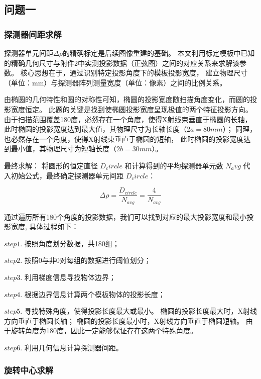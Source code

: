 \subsection{问题一}
\subsubsection{探测器间距求解}

探测器单元间距$\Delta\rho$的精确标定是后续图像重建的基础。
本文利用标定模板中已知的精确几何尺寸与附件2中实测投影数据（正弦图）之间的对应关系来求解该参数。
核心思想在于，通过识别特定投影角度下的模板投影宽度，
建立物理尺寸（单位：mm）与探测器阵列测量宽度（单位：像素）之间的比例关系。\par


由椭圆的几何特性和圆的对称性可知，椭圆的投影宽度随扫描角度变化，而圆的投影宽度恒定。
此题的关键是找到使椭圆投影宽度呈现极值的两个特征投影方向。
由于扫描范围覆盖180度，必然存在一个角度，使得X射线束垂直于椭圆的长轴，
此时椭圆的投影宽度达到最大值，其物理尺寸为长轴长度（$2a=80mm$）；
同理，也必然存在一个角度，使得X射线束垂直于椭圆的短轴，
此时椭圆的投影宽度达到最小值，其物理尺寸为短轴长度（$2b=30mm$）。\par


最终求解：
将圆形的恒定直径 $D_circle$ 和计算得到的平均探测器单元数 $N_avg$ 代入初始公式，最终确定探测器单元间距 $D_circle$：

$$\Delta\rho = \frac{D_{circle}}{N_{avg}} = \frac{4}{N_{avg}}$$

通过遍历所有180个角度的投影数据，我们可以找到对应的最大投影宽度和最小投影宽度,
具体过程如下：\par
$step1.$ 按照角度划分数据，共180组；\par
$step2.$ 按照0与非0对每组的数据进行阈值划分；\par
$step3.$ 利用梯度信息寻找物体边界；\par
$step4.$ 根据边界信息计算两个模板物体的投影长度；\par
$step5.$ 寻找特殊角度，使得投影长度最大或最小。
椭圆的投影长度最大时，X射线方向垂直于椭圆长轴；
椭圆的投影长度最小时，X射线方向垂直于椭圆短轴。
由于旋转角度为180度，因此一定能够保证存在这两个特殊角度。\par
$step6.$ 利用几何信息计算探测器间距。


\subsubsection{旋转中心求解}

